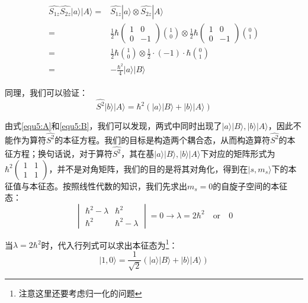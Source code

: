 \begin{align}
    \begin{split}
        \widehat{S_{1z}}\widehat{S_{2z}}|a\rangle|A\rangle=&\hat{S_{1z}}|a\rangle \otimes \widehat{S_{2z}}|A\rangle\\
        =&\frac{1}{2}\hbar \begin{pmatrix}
        1 & 0\\
        0 & -1
        \end{pmatrix}\binom{1}{0}\otimes \frac{1}{2}\hbar \begin{pmatrix}
        1 & 0\\
        0 & -1
        \end{pmatrix}\binom{0}{1}\\
        =&\frac{1}{2}\hbar\binom{1}{0}\otimes \frac{1}{2}\cdot (-1)\cdot \hbar\binom{0}{1}\\
        =&-\frac{\hbar^2}{4}|a\rangle|B\rangle
    \end{split}
\end{align}

同理，我们可以验证：
\begin{equation}\label{equ5:B}
    \hat{S^2}|b\rangle|A\rangle=\hbar^2(|a\rangle|B\rangle+|b\rangle|A\rangle)
\end{equation}

由式\eqref{equ5:A}和\eqref{equ5:B}，我们可以发现，两式中同时出现了$|a\rangle|B\rangle,|b
\rangle|A\rangle$，因此不能作为算符$\hat{S^2}$的本征方程。我们的目标是构造两个耦合态，从而构造算符$\hat{S^2}$的本征方程；换句话说，对于算符$\hat{S^2}$，其在基$|a\rangle|B\rangle,|b\rangle|A\rangle$下对应的矩阵形式为$\hbar^2\left(
\begin{smallmatrix} 1 & 1\\ 1 & 1
\end{smallmatrix}\right)$，并不是对角矩阵，我们的目的是将其对角化，得到在$|s,m_s\rangle$下的本征值与本征态。按照线性代数的知识，我们先求出$m_s=0$的自旋子空间的本征态：
\begin{equation}
    \begin{vmatrix}
    \hbar^2-\lambda & \hbar^2\\
    \hbar^2 & \hbar^2-\lambda 
    \end{vmatrix}=0 \rightarrow \lambda=2\hbar^2 \quad\textrm{or}\quad 0
\end{equation}

当$\lambda=2\hbar^2$时，代入行列式可以求出本征态为\footnote{注意这里还要考虑归一化的问题}：
\begin{equation}
    |1,0\rangle=\frac{1}{\sqrt{2}}(|a\rangle|B\rangle+|b\rangle|A\rangle)
\end{equation}

